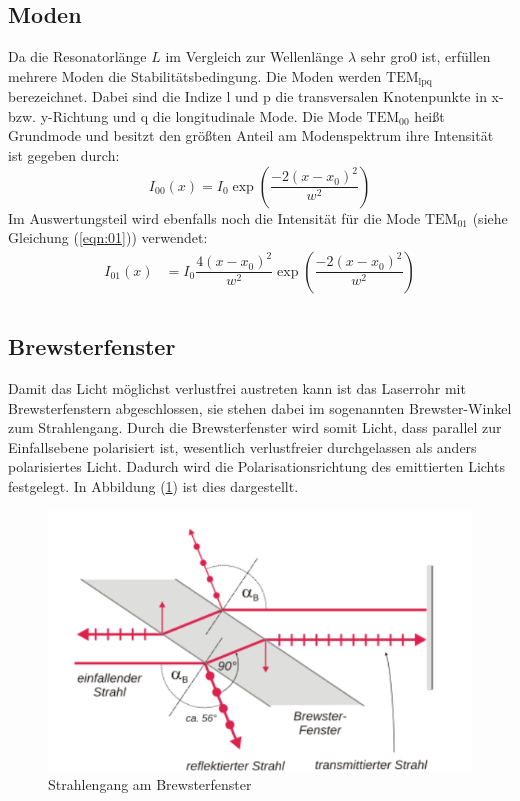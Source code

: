 \subsection{Moden}
\label{sec:modee}
Da die Resonatorlänge $L$ im  Vergleich zur Wellenlänge $\lambda$ sehr gro0 ist, erfüllen mehrere Moden die Stabilitätsbedingung. Die Moden werden $\mathrm{TEM}_\mathrm{lpq}$ berezeichnet. Dabei sind die Indize l und p die transversalen Knotenpunkte
in x- bzw. y-Richtung und q die longitudinale Mode. Die Mode $\mathrm{TEM}_\mathrm{00}$ heißt Grundmode und besitzt den größten Anteil am Modenspektrum ihre Intensität ist gegeben durch:
\begin{equation}
  \label{eqn:grundmode}
  I_\mathrm{00}(x)=I_\mathrm{0}\exp\left(\dfrac{-2(x-x_\mathrm{0})^2}{w^2}\right)
\end{equation}
Im Auswertungsteil wird ebenfalls noch die Intensität für die Mode $\mathrm{TEM}_\mathrm{01}$ (siehe Gleichung (\ref{eqn:01})) verwendet:
\begin{align}
  \label{eqn:01}
  I_\mathrm{01}(x)&=I_\mathrm{0}\dfrac{4(x-x_\mathrm{0})^2}{w^2}\exp\left(\dfrac{-2(x-x_\mathrm{0})^2}{w^2}\right) \\
\end{align}
\subsection{Brewsterfenster}
\label{sec:brews}
Damit das Licht möglichst verlustfrei austreten kann ist das Laserrohr mit Brewsterfenstern abgeschlossen, sie stehen dabei im sogenannten Brewster-Winkel zum Strahlengang. Durch die Brewsterfenster wird somit Licht, dass parallel
zur Einfallsebene polarisiert ist, wesentlich verlustfreier durchgelassen als anders polarisiertes Licht. Dadurch wird die Polarisationsrichtung des emittierten Lichts festgelegt. In Abbildung (\ref{fig:brew}) ist dies dargestellt.
\begin{figure}[h!]
  \centering
  \includegraphics[scale=0.5]{fig/brew.png}
  \caption{Strahlengang am Brewsterfenster \cite{Anleitung6}}
  \label{fig:brew}
\end{figure}
